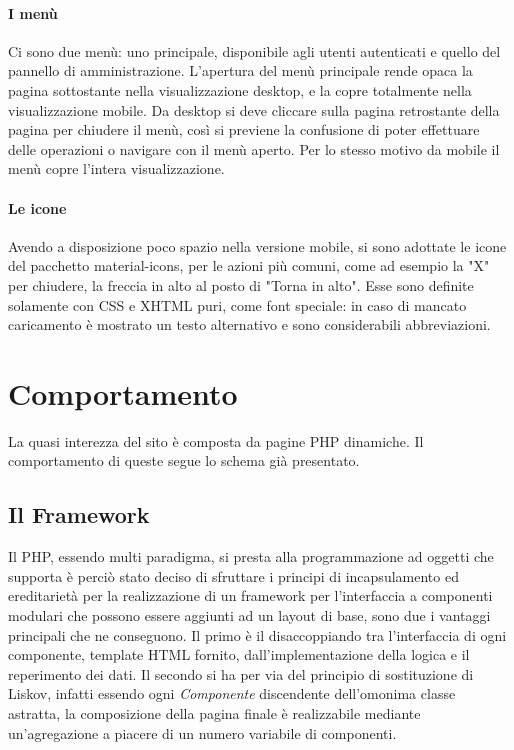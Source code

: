 \documentclass[12pt, a4paper]{article}
\begin{document}
    \paragraph{I menù} Ci sono due menù: uno principale, disponibile agli utenti autenticati e quello del pannello di amministrazione. L'apertura del menù principale rende opaca la pagina sottostante nella visualizzazione desktop, e la copre totalmente nella visualizzazione mobile. Da desktop si deve cliccare sulla pagina retrostante della pagina per chiudere il menù, così si previene la confusione di poter effettuare delle operazioni o navigare con il menù aperto. Per lo stesso motivo da mobile il menù copre l'intera visualizzazione.

    \paragraph{Le icone} Avendo a disposizione poco spazio nella versione mobile, si sono adottate le icone del pacchetto material-icons, per le azioni più comuni, come ad esempio la "X" per chiudere, la freccia in alto al posto di "Torna in alto". Esse sono definite solamente con CSS e XHTML puri, come font speciale: in caso di mancato caricamento è mostrato un testo alternativo e sono considerabili abbreviazioni.


    \section{Comportamento}
    La quasi interezza del sito è composta da pagine PHP dinamiche.
    Il comportamento di queste segue lo schema già presentato.

    \subsection{Il Framework}

    Il PHP, essendo multi paradigma, si presta alla programmazione ad oggetti che supporta è perciò stato deciso di
    sfruttare i principi di incapsulamento ed ereditarietà per la realizzazione di un framework per l'interfaccia a
    componenti modulari che possono essere aggiunti ad un layout di base, sono due i vantaggi principali che ne conseguono.
    Il primo è il disaccoppiando tra l'interfaccia di ogni componente, template HTML fornito,  dall'implementazione della logica e il reperimento dei dati.
    Il secondo si ha per via del principio di sostituzione di Liskov, infatti essendo ogni \emph{Componente} discendente
    dell'omonima classe astratta, la composizione della pagina finale è realizzabile mediante un'agregazione a piacere di un numero variabile di componenti.
\end{document}

